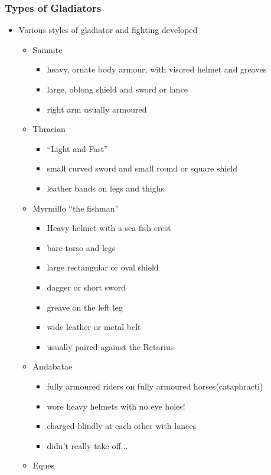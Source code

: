 \documentclass[12pt, twoside]{article}
\begin{document}
\subsubsection{Types of Gladiators}
\begin{itemize}
\item Various styles of gladiator and fighting developed
	\begin{itemize}
	\item Samnite
		\begin{itemize}
		\item heavy, ornate body armour, with visored helmet and greaves
		\item large, oblong shield and sword or lance
		\item right arm usually armoured
		\end{itemize}
	\item Thracian
		\begin{itemize}
		\item “Light and Fast”
		\item small curved sword and small round or square shield
		\item leather bands on legs and thighs
		\end{itemize}
	\item Myrmillo “the fishman”
		\begin{itemize}
		\item Heavy helmet with a sea fish crest
		\item bare torso and legs
		\item large rectangular or oval shield
		\item dagger or short sword
		\item greave on the left leg
		\item wide leather or metal belt
		\item usually paired against the Retarius
		\end{itemize}
	\item Andabatae
		\begin{itemize}
		\item fully armoured riders on fully armoured horses(cataphracti)
		\item wore heavy helmets with no eye holes!
		\item charged blindly at each other with lances
		\item didn't really take off...
		\end{itemize}
	\item Eques
		\begin{itemize}

\end{itemize}
\end{itemize}
\end{itemize}
\end{document}
